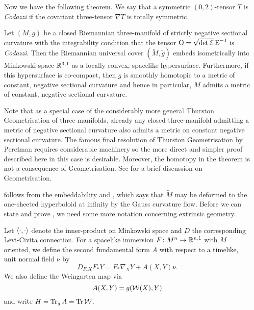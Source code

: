 \documentclass[a4paper,12pt]{amsart}
\begin{document}
Now we have the following theorem. We say that a symmetric \((0,2)\)-tensor \(T\) is \emph{Codazzi} if the covariant three-tensor \(\nabla T\) is totally symmetric.

\begin{thm}
\label{thm:intg_const_curv}

Let \((M, g)\) be a closed Riemannian three-manifold of strictly negative sectional curvature with the integrability condition that the tensor \(\operatorname{O} = \sqrt{\det \operatorname{\mathcal{E}}} \operatorname{E}^{-1}\) is \emph{Codazzi}.
Then the Riemannian universal cover \((\tilde{M}, \tilde{g})\) embeds isometrically into Minkowski space \(\mathbb{R}^{3,1}\) as a locally convex, spacelike hypersurface. Furthermore, if this hypersurface is co-compact, then \(g\) is smoothly homotopic to a metric of constant, negative sectional curvature and hence in particular, \(M\) admits a metric of constant, negative sectional curvature.
\end{thm}

Note that as a special case of the considerably more general Thurston Geometrisation of three manifolds, already any closed three-manifold admitting a metric of negative sectional curvature also admits a metric on constant negative sectional curvature. The famous final resolution of Thurston Geometrisation by Perelman requires considerable machinery so the more direct and simpler proof described here in this case is desirable. Moreover, the homotopy in the theorem is not a consequence of Geometrisation. See  for a brief discussion on Geometrisation.

 follows from the embeddability  and \cite[Theorem 1.1]{MR3344442}, which says that \(\tilde M\) may be deformed to the one-sheeted hyperboloid at infinity by the Gauss curvature flow.
Before we can state and prove , we need some more notation concerning extrinsic geometry.

Let \(\left\langle \cdot,\cdot \right\rangle\) denote the inner-product on Minkowski space and \(D\) the corresponding Levi-Civita connection. For a spacelike immersion \(F\colon M^n \to \mathbb{R}^{n,1}\) with \(M\) oriented, we define the second fundamental form $A$ with respect to a timelike, unit normal field $\nu$ by
\[
D_{F_{\ast} X} F_{\ast} Y = F_{\ast} \nabla_X Y + A(X,Y)\nu.
\]
We also define the Weingarten map via
\[
A(X, Y) =  g(\operatorname{\mathcal{W}}(X), Y)
\]
and write $H = \operatorname{Tr}_{g}A = \operatorname{Tr} \operatorname{\mathcal{W}}$.
\end{document}
